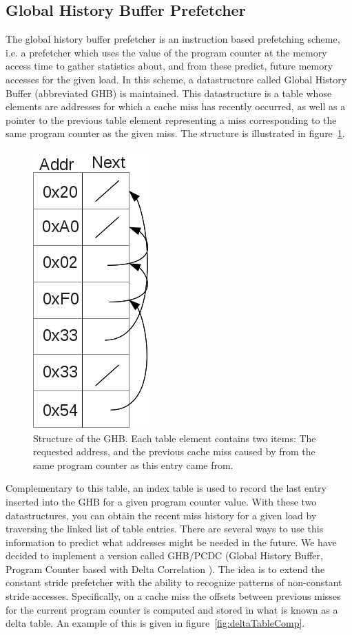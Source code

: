 \subsection{Global History Buffer Prefetcher}
\label{sec:ghbPcdcPrefetcher}

The global history buffer prefetcher is an instruction based
prefetching scheme, i.e. a prefetcher which uses the value of the
program counter at the memory access time to gather statistics about,
and from these predict, future memory accesses for the given load. In
this scheme, a datastructure called Global History Buffer (abbreviated
GHB) is maintained. This datastructure is a table whose elements are
addresses for which a cache miss has recently occurred, as well as a
pointer to the previous table element representing a miss
corresponding to the same program counter as the given miss. The
structure is illustrated in figure~\ref{fig:ghbStruct}.

\begin{figure}[ht]
  \centering
  \includegraphics[scale=0.5]{figures/ghb_diag.png}
  \caption{\label{fig:ghbStruct} Structure of the GHB. Each table
    element contains two items: The requested address, and the
    previous cache miss caused by from the same program counter as
    this entry came from.}
\end{figure}

Complementary to this table, an index table is used to record the last
entry inserted into the GHB for a given program counter value. With
these two datastructures, you can obtain the recent miss history for a
given load by traversing the linked list of table entries. There are
several ways to use this information to predict what addresses might
be needed in the future. We have decided to implement a version called
GHB/PCDC (Global History Buffer, Program Counter based with Delta
Correlation \cite{Grannas}). The idea is to extend the constant stride
prefetcher with the ability to recognize patterns of non-constant
stride accesses. Specifically, on a cache miss the offsets between
previous misses for the current program counter is computed and stored
in what is known as a delta table. An example of this is given in
figure~\ref{fig:deltaTableComp}. 

